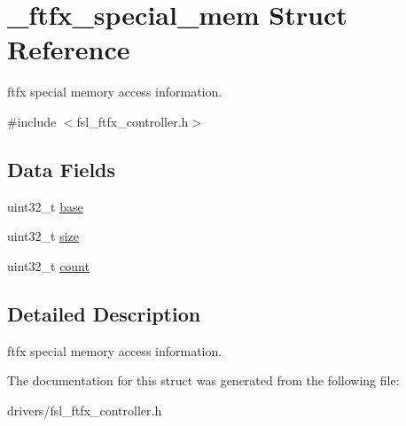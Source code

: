 \hypertarget{struct__ftfx__special__mem}{}\section{\+\_\+ftfx\+\_\+special\+\_\+mem Struct Reference}
\label{struct__ftfx__special__mem}


ftfx special memory access information.  




{\ttfamily \#include $<$fsl\+\_\+ftfx\+\_\+controller.\+h$>$}

\subsection*{Data Fields}
\begin{DoxyCompactItemize}
\item 
uint32\+\_\+t \mbox{\hyperlink{group__ftfx__controller_ga0523cedff47e2441fc198b7770ec5d3f}{base}}
\item 
uint32\+\_\+t \mbox{\hyperlink{group__ftfx__controller_gab2c6b258f02add8fdf4cfc7c371dd772}{size}}
\item 
uint32\+\_\+t \mbox{\hyperlink{group__ftfx__controller_ga86988a65e0d3ece7990c032c159786d6}{count}}
\end{DoxyCompactItemize}


\subsection{Detailed Description}
ftfx special memory access information. 

The documentation for this struct was generated from the following file\+:\begin{DoxyCompactItemize}
\item 
drivers/fsl\+\_\+ftfx\+\_\+controller.\+h\end{DoxyCompactItemize}
